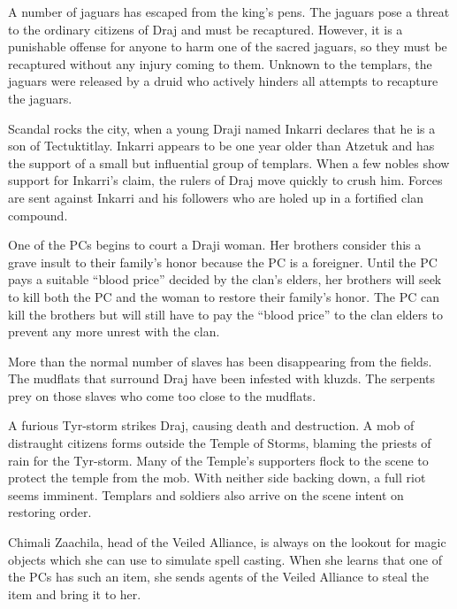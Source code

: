 {
	\item A number of jaguars has escaped from the king's pens. The jaguars pose a threat to the ordinary citizens of Draj and must be recaptured. However, it is a punishable offense for anyone to harm one of the sacred jaguars, so they must be recaptured without any injury coming to them. Unknown to the templars, the jaguars were released by a druid who actively hinders all attempts to recapture the jaguars.
	\item Scandal rocks the city, when a young Draji named Inkarri declares that he is a son of Tectuktitlay. Inkarri appears to be one year older than Atzetuk and has the support of a small but influential group of templars. When a few nobles show support for Inkarri's claim, the rulers of Draj move quickly to crush him. Forces are sent against Inkarri and his followers who are holed up in a fortified clan compound.
	\item One of the PCs begins to court a Draji woman. Her brothers consider this a grave insult to their family's honor because the PC is a foreigner. Until the PC pays a suitable ``blood price'' decided by the clan's elders, her brothers will seek to kill both the PC and the woman to restore their family's honor. The PC can kill the brothers but will still have to pay the ``blood price'' to the clan elders to prevent any more unrest with the clan.
	\item More than the normal number of slaves has been disappearing from the fields. The mudflats that surround Draj have been infested with kluzds. The serpents prey on those slaves who come too close to the mudflats.
	\item A furious Tyr-storm strikes Draj, causing death and destruction. A mob of distraught citizens forms outside the Temple of Storms, blaming the priests of rain for the Tyr-storm. Many of the Temple's supporters flock to the scene to protect the temple from the mob. With neither side backing down, a full riot seems imminent. Templars and soldiers also arrive on the scene intent on restoring order.
	\item Chimali Zaachila, head of the Veiled Alliance, is always on the lookout for magic objects which she can use to simulate spell casting. When she learns that one of the PCs has such an item, she sends agents of the Veiled Alliance to steal the item and bring it to her. 
}